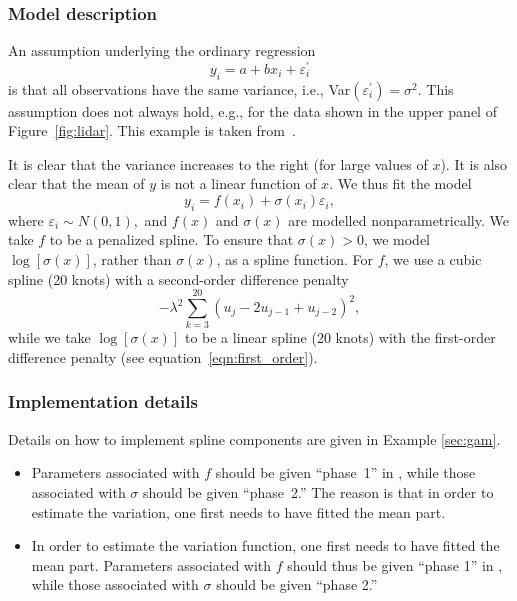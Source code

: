 \documentclass{admbmanual}
\newcommand{\citeasnoun}{\cite}
\begin{document}
\subsubsection{Model description}
An assumption underlying the ordinary regression
\[
y_i=a+bx_i+\varepsilon_i^{\prime}
\]
is that all observations have the same variance, i.e.,
Var$\left(\varepsilon_i^{\prime}\right) =\sigma^2$. This assumption does
not always hold, e.g., for the data shown in the upper panel of
Figure~\ref{fig:lidar}. This example is taken
from~\citeasnoun{rupp:wand:carr:2003}.

It is clear that the variance increases to the right (for large values of $x$).
It is also clear that the mean of $y$ is not a linear function of $x$. We thus
fit the model
\[
y_i=f(x_i)+\sigma (x_i)\varepsilon_i,
\]
where $\varepsilon_i\sim N(0,1),$ and $f(x)$ and $\sigma (x)$ are modelled
nonparametrically. We take $f$ to be a penalized spline. To ensure that $\sigma
(x)>0$, we model $\log \left[ \sigma (x)\right] $, rather than $\sigma (x)$, as
a spline function. For $f$, we use a cubic spline (20 knots) with a second-order
difference penalty%
\[
-\lambda^2\sum_{k=3}^{20}\left(u_j-2u_{j-1}+u_{j-2}\right)^2,
\]
while we take $\log \left[ \sigma (x)\right]$ to be a linear spline (20 knots)
with the first-order difference penalty (see equation~\ref{eqn:first_order}).

\subsubsection{Implementation details}

Details on how to implement spline components are given in Example
\ref{sec:gam}.

\begin{itemize}
  \item Parameters associated with $f$ should be given ``phase~1'' in \scAB,
  while those associated with $\sigma $ should be given ``phase~2.'' The reason
  is that in order to estimate the variation, one first needs to have fitted the
  mean part.

  \item In order to estimate the variation function, one first needs to have
  fitted the mean part. Parameters associated with $f$ should thus be given
  ``phase 1'' in \scAB, while those associated with $\sigma$ should be given
  ``phase 2.''
\end{itemize}
\end{document}
